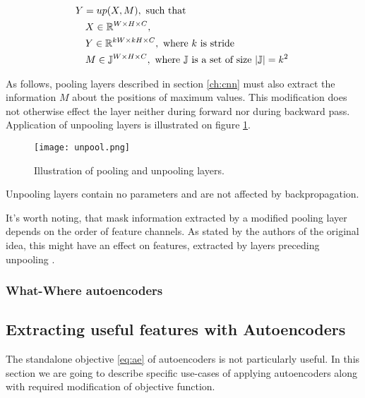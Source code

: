 \begin{equation}\label{eq:unp}
  \begin{aligned}
    & Y = up(X, M),\text{ such that} \\
    & \quad X \in \Bbb{R}^{W \times H \times C}, \\
    & \quad Y \in \Bbb{R}^{kW \times kH \times C}, \text{ where $k$ is stride } \\
    & \quad M \in \Bbb{J}^{W \times H \times C}, \text{ where $\Bbb{J}$ is a set of size $|\Bbb{J}|=k^2$ }
  \end{aligned}
\end{equation}

As follows, pooling layers described in section \ref{ch:cnn} must also extract the information $M$ about the positions of maximum values. This modification does not otherwise effect the layer neither during forward nor during backward pass. Application of unpooling layers is illustrated on figure \ref{fig:unpool}.

\begin{figure}[h!]
  \centering
    \texttt{[image: unpool.png]}
  \caption{Illustration of pooling and unpooling layers.}
  \label{fig:unpool}
\end{figure}

Unpooling layers contain no parameters and are not affected by backpropagation.

It's worth noting, that mask information extracted by a modified pooling layer depends on the order of feature channels. As stated by the authors of the original idea, this might have an effect on features, extracted by layers preceding unpooling \cite{Zhao2015}.

\subsubsection{What-Where autoencoders}



\subsection{Extracting useful features with Autoencoders}\label{ch:mod_ae}

The standalone objective \ref{eq:ae} of autoencoders is not particularly useful.
In this section we are going to describe specific use-cases of applying autoencoders along with required modification of objective function.


